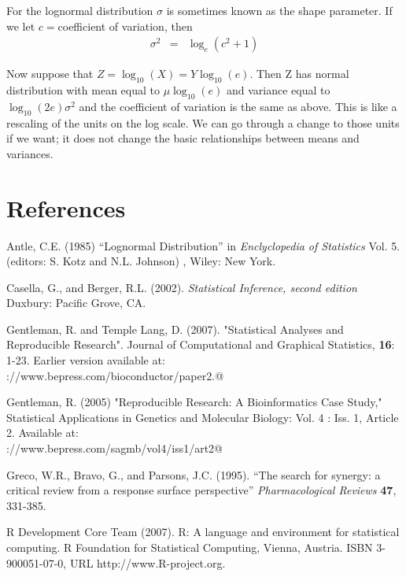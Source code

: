 \documentclass{article}[12pt]
\begin{document}
For the lognormal distribution $\sigma$ is sometimes known as the 
shape parameter. If we let $c=$coefficient of variation, then
\begin{eqnarray*}
\sigma^2 & = & \log_e(c^2 +1)
\end{eqnarray*}

Now suppose that $Z = \log_{10}(X) =  Y \log_{10}(e)$. Then Z has 
normal distribution with mean equal to $\mu \log_{10}(e)$ and 
variance equal to $\log_{10}(2e)\sigma^2$ and the coefficient of 
variation is the same as above. This is like a rescaling of the 
units on the log scale. We can go through a change to those units if 
we want; it does not change the basic relationships between means and 
variances.

\section*{References}


\begin{description}
\item Antle, C.E. (1985) ``Lognormal Distribution'' in {\it Enclyclopedia of 
Statistics} Vol. 5. (editors: S. Kotz and N.L. Johnson) , Wiley: New York.
\item Casella, G., and Berger, R.L. (2002). {\it Statistical Inference, second edition}
Duxbury: Pacific Grove, CA.
\item Gentleman, R.  and  Temple Lang, D. (2007). "Statistical 
Analyses and Reproducible Research". Journal of Computational and Graphical Statistics,
{\bf 16}: 1-23. Earlier version available at:\\
\verb@http://www.bepress.com/bioconductor/paper2.@
\item  Gentleman, R. (2005) "Reproducible Research: A Bioinformatics 
Case Study," Statistical Applications in Genetics and Molecular 
Biology: Vol. 4 : Iss. 1, Article 2.
Available at: \\ 
\verb@http://www.bepress.com/sagmb/vol4/iss1/art2@
\item Greco, W.R., Bravo, G., and Parsons, J.C. (1995). ``The search for synergy: a critical review from a response surface 
perspective'' {\it Pharmacological Reviews} {\bf 47}, 331-385.
\item   R Development Core Team (2007). R: A language and environment for
  statistical computing. R Foundation for Statistical Computing,
  Vienna, Austria. ISBN 3-900051-07-0, URL http://www.R-project.org.
\end{description}
\end{document}
